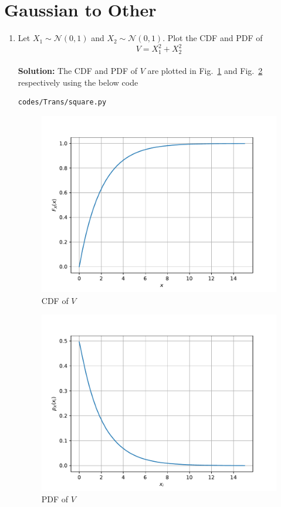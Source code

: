 \documentclass[journal,8pt,onecolumn]{IEEEtran}
\newcommand\figref{Fig.~\ref}
\newcommand{\solution}{\noindent \textbf{Solution: }}
\providecommand{\gauss}[2]{\mathcal{N}\ensuremath{\left(#1,#2\right)}}
\begin{document}
\section{Gaussian to Other}
\begin{enumerate}
\item
Let $X_1 \sim  \gauss{0}{1}$ and $X_2 \sim  \gauss{0}{1}$. Plot the CDF and PDF of
%
\begin{equation}
V = X_1^2 + X_2^2
\end{equation}\\
\solution The CDF and PDF of $V$ are plotted in \figref{fig:chisq_cdf} and \figref{fig:chisq_pdf} respectively using the below code
\begin{lstlisting}
codes/Trans/square.py
\end{lstlisting}
\begin{figure}[H]
\centering
\includegraphics[width=\columnwidth/2]{./figs/chisq_cdf.pdf}
\caption{CDF of $V$}
\label{fig:chisq_cdf}
\end{figure}
\begin{figure}[H]
\centering
\includegraphics[width=\columnwidth/2]{./figs/chisq_pdf.pdf}
\caption{PDF of $V$}
\label{fig:chisq_pdf}
\end{figure}
%


\end{enumerate}
\end{document}
